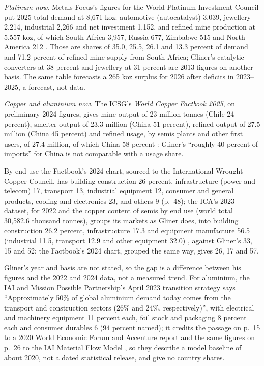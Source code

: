 \begin{qfdefinition}
\emph{Platinum now}. Metals Focus's figures for the World Platinum Investment Council put 2025 total demand at 8{,}671 koz: automotive (autocatalyst) 3{,}039, jewellery 2{,}214, industrial 2{,}266 and net investment 1{,}152, and refined mine production at 5{,}557 koz, of which South Africa 3{,}957, Russia 677, Zimbabwe 515 and North America 212 \citep[Table~1, p.~5]{wpic-pq-2026q2}. Those are shares of 35.0, 25.5, 26.1 and 13.3 percent of demand and 71.2 percent of refined mine supply from South Africa; Gliner's catalytic converters at 38 percent and jewellery at 31 percent are 2013 figures on another basis. The same table forecasts a 265 koz surplus for 2026 after deficits in 2023--2025, a forecast, not data.

\emph{Copper and aluminium now}. The ICSG's \emph{World Copper Factbook 2025}, on preliminary 2024 figures, gives mine output of 23 million tonnes (Chile 24 percent), smelter output of 23.3 million (China 51 percent), refined output of 27.5 million (China 45 percent) and refined usage, by semis plants and other first users, of 27.4 million, of which China 58 percent \citep[p.~5]{icsg-factbook-2025}: Gliner's ``roughly 40 percent of imports'' for China is not comparable with a usage share.

By end use the Factbook's 2024 chart, sourced to the International Wrought Copper Council, has building construction 26 percent, infrastructure (power and telecom) 17, transport 13, industrial equipment 12, consumer and general products, cooling and electronics 23, and others 9 (p.~48); the ICA's 2023 dataset, for 2022 and the copper content of semis by end use (world total 30{,}582.6 thousand tonnes), groups its markets as Gliner does, into building construction 26.2 percent, infrastructure 17.3 and equipment manufacture 56.5 (industrial 11.5, transport 12.9 and other equipment 32.0) \citep[World sheet, rows~48--51]{ica-semis-enduse-2023}, against Gliner's 33, 15 and 52; the Factbook's 2024 chart, grouped the same way, gives 26, 17 and 57.

Gliner's year and basis are not stated, so the gap is a difference between his figures and the 2022 and 2024 data, not a measured trend. For aluminium, the IAI and Mission Possible Partnership's April 2023 transition strategy says ``Approximately 50\% of global aluminium demand today comes from the transport and construction sectors (26\% and 24\%, respectively)'', with electrical and machinery equipment 11 percent each, foil stock and packaging 8 percent each and consumer durables 6 (94 percent named); it credits the passage on p.~15 to a 2020 World Economic Forum and Accenture report and the same figures on p.~26 to the IAI Material Flow Model \citep[PDF pp.~15 and~26, endnotes 3 and~16]{iai-mpp-2023}, so they describe a model baseline of about 2020, not a dated statistical release, and give no country shares.


\end{qfdefinition}
